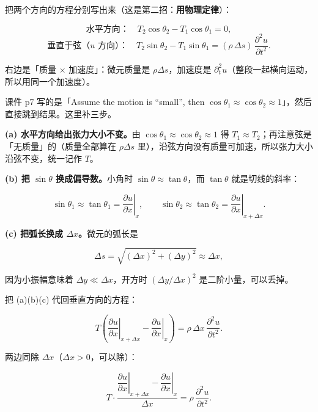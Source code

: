 把两个方向的方程分别写出来（这是第二招：\textbf{用物理定律}）：

\[
\text{水平方向：}\quad T_2\cos\theta_2-T_1\cos\theta_1=0,
\]
\[
\text{垂直于弦（$u$ 方向）：}\quad T_2\sin\theta_2-T_1\sin\theta_1=(\rho\,\Delta s)\,\frac{\partial^2u}{\partial t^2}.
\]

右边是「质量 $\times$ 加速度」：微元质量是 $\rho\Delta s$，加速度是 $\partial_t^2u$（整段一起横向运动，所以用同一个加速度）。


课件 p7 写的是「Assume the motion is ``small'', then $\cos\theta_1\approx\cos\theta_2\approx1$」，然后直接跳到结果。这里补三步。

\textbf{(a) 水平方向给出张力大小不变。}由 $\cos\theta_1\approx\cos\theta_2\approx1$ 得 $T_1\approx T_2$；再注意弦是「无质量」的（质量全部算在 $\rho\Delta s$ 里），沿弦方向没有质量可加速，所以张力大小沿弦不变，统一记作 $T$。

\textbf{(b) 把 $\sin\theta$ 换成偏导数。}小角时 $\sin\theta\approx\tan\theta$，而 $\tan\theta$ 就是切线的斜率：

\[
\sin\theta_1\approx\tan\theta_1=\left.\frac{\partial u}{\partial x}\right|_{x},
\qquad
\sin\theta_2\approx\tan\theta_2=\left.\frac{\partial u}{\partial x}\right|_{x+\Delta x}.
\]

\textbf{(c) 把弧长换成 $\Delta x$。}微元的弧长是

\[
\Delta s=\sqrt{(\Delta x)^2+(\Delta y)^2}\approx\Delta x,
\]

因为小振幅意味着 $\Delta y\ll\Delta x$，开方时 $(\Delta y/\Delta x)^2$ 是二阶小量，可以丢掉。


把 (a)(b)(c) 代回垂直方向的方程：

\[
T\left(\left.\frac{\partial u}{\partial x}\right|_{x+\Delta x}
-\left.\frac{\partial u}{\partial x}\right|_{x}\right)
=\rho\,\Delta x\,\frac{\partial^2u}{\partial t^2}.
\]


两边同除 $\Delta x$（$\Delta x>0$，可以除）：

\[
T\cdot\frac{\left.\dfrac{\partial u}{\partial x}\right|_{x+\Delta x}-\left.\dfrac{\partial u}{\partial x}\right|_{x}}{\Delta x}
=\rho\,\frac{\partial^2u}{\partial t^2}.
\]

